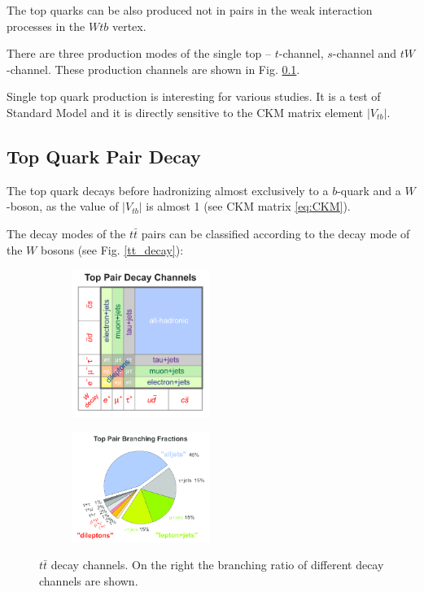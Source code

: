 The top quarks can be also produced not in pairs in the weak interaction processes in the $Wtb$ vertex.

There are three production modes of the single top -- $t$-channel, $s$-channel and $tW$-channel. These production channels are shown in Fig. \ref{}.

Single top quark production is interesting for various studies. It is a test of Standard Model and it is directly sensitive to the CKM matrix
element $|V_{tb}|$.

\subsection{Top Quark Pair Decay}

The top quark decays before hadronizing almost exclusively to a $b$-quark and a $W$-boson, as the value of $|V_{tb}|$ is almost 1 (see CKM matrix \ref{eq:CKM}).

The decay modes of the $t\bar{t}$ pairs can be classified according to the decay mode of the $W$ bosons (see Fig. \ref{tt_decay}):

\begin{figure}[h]
\centering
\begin{subfigure}
  \centering
  \includegraphics[width=0.49\textwidth]{01_Theory_SM/plots/top_pair_decay_channels.png}
\end{subfigure}
\begin{subfigure}
  \centering
  \includegraphics[width=0.49\textwidth]{01_Theory_SM/plots/top_pair_branching_frac.png}
\end{subfigure}
\caption{$t\bar{t}$ decay channels. On the right the branching ratio of different decay channels are shown.}
  \label{fig:tt_decay}
\end{figure}

